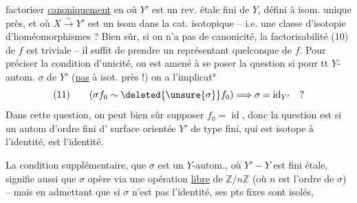 factoriser \uline{canoniquement} en
où $Y'$ est un rev. étale fini de $Y$, défini à isom. unique près, et où $X\xrightarrow{\sim}Y'$ est un isom dans la cat. isotopique -- i.e. une classe d'isotopie d'homéomorphismes ? Bien sûr, si on n'a pas  de canonicité, la factorisabilité (10) de $f$ est triviale -- il suffit de prendre un représentant quelconque de $f$.  Pour préciser la  condition d'unicité, on est amené à se poser la question si pour tt $Y$-autom.  $\sigma$ de $Y'$  (\uline{pas} à isot. près !)  on a l'implicat°
\[
(11)\qquad (\sigma f_0\sim\deleted{\unsure{\sigma}}f_0)\Longrightarrow\sigma=\operatorname{id}_{Y'}\quad ?
\]
Dans cette question, on peut bien sûr supposer $f_0=\operatorname{id}$, donc la question est si un autom d'ordre fini \inserted{$\sigma$} d'  surface orientée $Y'$ de type fini, qui est isotope à l'identité, est l'identité.

La condition supplémentaire, que $\sigma$ est un $Y$-autom., où $Y'\mathbin{-}Y$ est fini étale, signifie aussi que $\sigma$ opère via une opération \uline{libre} de $\mathbb{Z}/n\mathbb{Z}$ (où $n$ est l'ordre de $\sigma$) -- mais en admettant que si $\sigma$  n'est pas l'identité, ses pts fixes sont isolés,
